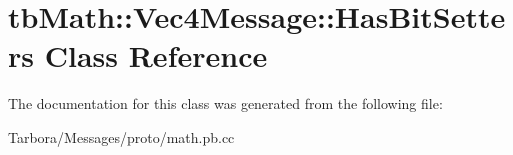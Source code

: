 \hypertarget{classtbMath_1_1Vec4Message_1_1HasBitSetters}{}\section{tb\+Math\+:\+:Vec4\+Message\+:\+:Has\+Bit\+Setters Class Reference}
\label{classtbMath_1_1Vec4Message_1_1HasBitSetters}


The documentation for this class was generated from the following file\+:\begin{DoxyCompactItemize}
\item 
Tarbora/\+Messages/proto/math.\+pb.\+cc\end{DoxyCompactItemize}
